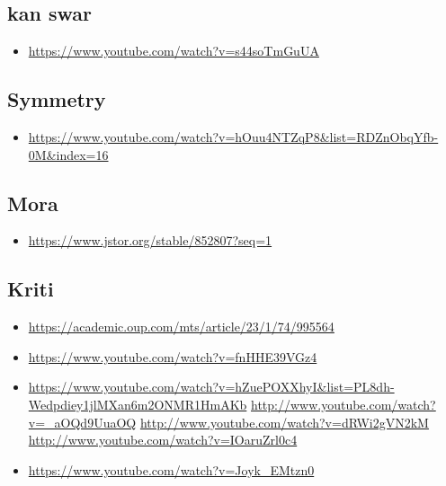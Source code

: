 \subsection{kan swar}
\label{sec:org2c8cdb3}
\begin{itemize}
\item \url{https://www.youtube.com/watch?v=s44soTmGuUA}
\end{itemize}

\subsection{Symmetry}
\label{sec:org0778a34}
\begin{itemize}
\item \url{https://www.youtube.com/watch?v=hOuu4NTZqP8\&list=RDZnObqYfb-0M\&index=16}
\end{itemize}

\subsection{Mora}
\label{sec:org538ab66}
\begin{itemize}
\item \url{https://www.jstor.org/stable/852807?seq=1}
\end{itemize}

\subsection{Kriti}
\label{sec:org2ed1911}
\begin{itemize}
\item \url{https://academic.oup.com/mts/article/23/1/74/995564}
\item \url{https://www.youtube.com/watch?v=fnHHE39VGz4}
\item \url{https://www.youtube.com/watch?v=hZuePOXXhyI\&list=PL8dh-Wedpdiey1jlMXan6m2ONMR1HmAKb}
\url{http://www.youtube.com/watch?v=\_aOQd9UuaOQ}
\url{http://www.youtube.com/watch?v=dRWi2gVN2kM}
\url{http://www.youtube.com/watch?v=IOaruZrl0c4}
\item \url{https://www.youtube.com/watch?v=Joyk\_EMtzn0}
\end{itemize}


